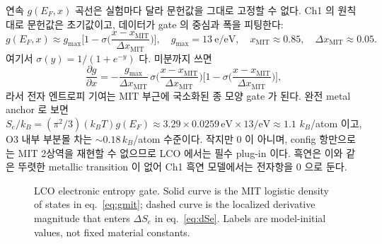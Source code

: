 \documentclass[11pt,a4paper]{article}
\begin{document}
연속 $g(E_F,x)$ 곡선은 실험마다 달라 문헌값을 그대로 고정할 수 없다. Ch1 의 원칙대로 문헌값은 초기값이고,
데이터가 gate 의 중심과 폭을 피팅한다:
\begin{equation}
g(E_F,x)\approx g_{\max}\Big[1-\sigma\!\Big(\frac{x-x_\mathrm{MIT}}{\Delta x_\mathrm{MIT}}\Big)\Big],
\quad
g_{\max}=13\ \mathrm{e/eV},\quad x_\mathrm{MIT}\approx0.85,\quad \Delta x_\mathrm{MIT}\approx0.05.
\label{eq:gmit}
\end{equation}
여기서 $\sigma(y)=1/(1+e^{-y})$ 다. 미분까지 쓰면
\begin{equation}
\frac{\partial g}{\partial x}
=-\frac{g_{\max}}{\Delta x_\mathrm{MIT}}\,
\sigma\!\Big(\frac{x-x_\mathrm{MIT}}{\Delta x_\mathrm{MIT}}\Big)
\Big[1-\sigma\!\Big(\frac{x-x_\mathrm{MIT}}{\Delta x_\mathrm{MIT}}\Big)\Big],
\label{eq:gmitprime}
\end{equation}
라서 전자 엔트로피 기여는 MIT 부근에 국소화된 종 모양 gate 가 된다. 완전 metal anchor 로 보면
$S_e/k_B=(\pi^2/3)(k_BT)g(E_F)\approx3.29\times0.0259\,\mathrm{eV}\times13/\mathrm{eV}\approx1.1$
$k_B$/atom 이고, O3 내부 부분몰 차는 $\sim0.18\,k_B$/atom 수준이다. 작지만 0 이 아니며, config 항만으로는
MIT 2상역을 재현할 수 없으므로 LCO 에서는 필수 plug-in 이다. 흑연은 이와 같은 뚜렷한 metallic transition 이 없어
Ch1 흑연 모델에서는 전자항을 $0$ 으로 둔다.

\begin{figure}[t]
\centering
{}
\caption{LCO electronic entropy gate. Solid curve is the MIT logistic density of states in
eq.~\eqref{eq:gmit}; dashed curve is the localized derivative magnitude that enters
$\Delta S_e$ in eq.~\eqref{eq:dSe}. Labels are model-initial values, not fixed material constants.}
\label{fig:lco_egate}
\end{figure}
\end{document}
